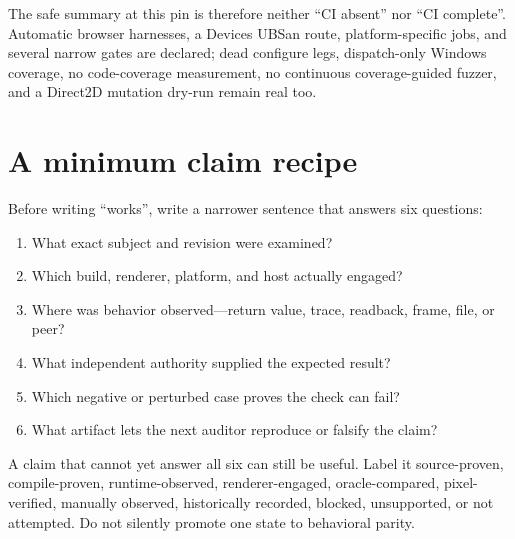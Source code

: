 The safe summary at this pin is therefore neither ``CI absent'' nor ``CI complete''.  Automatic
browser harnesses, a Devices UBSan route, platform-specific jobs, and several narrow gates are
declared; dead configure legs, dispatch-only Windows coverage, no code-coverage measurement, no
continuous coverage-guided fuzzer, and a Direct2D mutation dry-run remain real too.

\section{A minimum claim recipe}

Before writing ``works'', write a narrower sentence that answers six questions:

\begin{enumerate}
  \item What exact subject and revision were examined?
  \item Which build, renderer, platform, and host actually engaged?
  \item Where was behavior observed---return value, trace, readback, frame, file, or peer?
  \item What independent authority supplied the expected result?
  \item Which negative or perturbed case proves the check can fail?
  \item What artifact lets the next auditor reproduce or falsify the claim?
\end{enumerate}

A claim that cannot yet answer all six can still be useful. Label it source-proven,
compile-proven, runtime-observed, renderer-engaged, oracle-compared, pixel-verified, manually
observed, historically recorded, blocked, unsupported, or not attempted. Do not silently promote
one state to behavioral parity.
